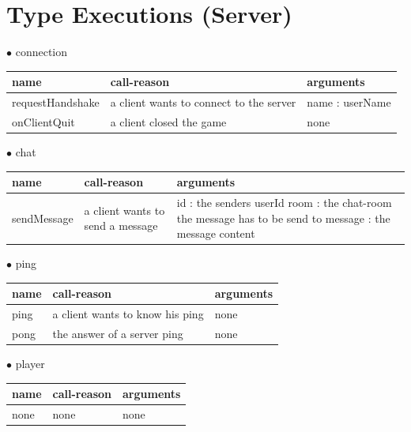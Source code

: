 \documentclass{scrartcl}
\newcommand{\n}{\newline}
\begin{document}
\pagebreak
\section{Type Executions (Server)}
$\bullet$ connection
\begin{center}
    \begin{tabular}{| p{3.1cm} | p{5cm} | p{5.9cm} |}
        \hline
        \textbf{name} & \textbf{call-reason} & \textbf{arguments} \\ \hline
        requestHandshake & a client wants to connect to the server & name : userName \\ \hline
        onClientQuit & a client closed the game & none \\ \hline
    \end{tabular}
\end{center}
$\bullet$ chat
\begin{center}
    \begin{tabular}{| p{3.1cm} | p{5cm} | p{5.9cm} |}
        \hline
        \textbf{name} & \textbf{call-reason} & \textbf{arguments} \\ \hline
        sendMessage & a client wants to send a message & 
        id : the senders userId\n
        room : the chat-room the message has to be send to\n
        message : the message content \\ \hline
    \end{tabular}
\end{center}
$\bullet$ ping
\begin{center}
    \begin{tabular}{| p{3.1cm} | p{5cm} | p{5.9cm} |}
        \hline
        \textbf{name} & \textbf{call-reason} & \textbf{arguments} \\ \hline
        ping & a client wants to know his ping & none \\ \hline
        pong & the answer of a server ping & none \\ \hline
    \end{tabular}
\end{center}
$\bullet$ player
\begin{center}
    \begin{tabular}{| p{3.1cm} | p{5cm} | p{5.9cm} |}
        \hline
        \textbf{name} & \textbf{call-reason} & \textbf{arguments} \\ \hline
        none & none & none \\ \hline
    \end{tabular}
\end{center}
\end{document}
